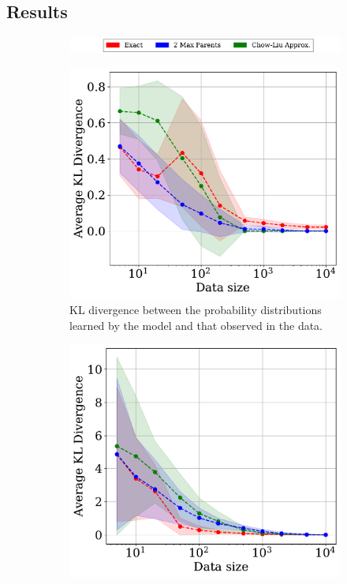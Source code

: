 \subsection{Results}
\begin{figure}[htp!]
     \centering
     \begin{subfigure}{0.7\textwidth}
         \centering
    \includegraphics[width=\textwidth]{plots/legends.pdf}
     \end{subfigure}
     \begin{subfigure}{0.32\textwidth}
         \centering
         \includegraphics[width=\textwidth]{plots/kl_divergence.pdf}
         \caption{KL divergence between the probability distributions learned by the model and that observed in the data.}
         \label{fig:kl_div_dist}
     \end{subfigure}
     \hfill
     \begin{subfigure}{0.32\textwidth}
         \centering
         \includegraphics[width=\textwidth]{plots/joint_dist_div.pdf}

\end{subfigure}
\end{figure}
